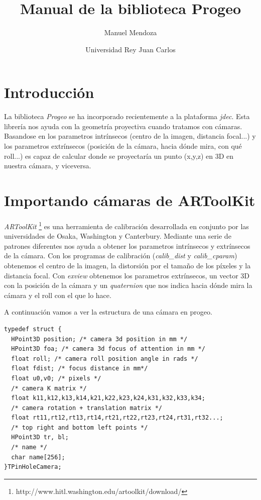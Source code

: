 \documentclass[a4paper,12pt,notitlepage,openany]{article}
\title{Manual de la biblioteca Progeo}
\author{Manuel Mendoza}
\date{Universidad Rey Juan Carlos}
\begin{document}
\maketitle
\tableofcontents

\section{Introducci\'on}

La biblioteca \textit{Progeo} se ha incorporado recientemente a la plataforma \textit{jdec}. Esta librer\'{i}a nos ayuda con la geometr\'{i}a proyectiva cuando tratamos con c\'{a}maras. Basandose en los parametros intr\'{i}nsecos (centro de la imagen, distancia focal...) y los parametros extr\'{i}nsecos (posici\'{o}n de la c\'{a}mara, hacia d\'{o}nde mira, con qu\'{e} roll...) es capaz de calcular donde se proyectar\'{i}a un punto (x,y,z) en 3D en nuestra c\'{a}mara, y viceversa.

\section{Importando c\'{a}maras de ARToolKit}

\textit{ARToolKit} \footnote{\label{1}http://www.hitl.washington.edu/artoolkit/download/} es una herramienta de calibraci\'{o}n desarrollada en conjunto por las universidades de Osaka, Washington y Canterbury. Mediante una serie de patrones diferentes nos ayuda a obtener los parametros intr\'{i}nsecos y extr\'{i}nsecos de la c\'{a}mara. Con los programas de calibraci\'{o}n (\textit{calib\_dist} y \textit{calib\_cparam}) obtenemos el centro de la imagen, la distorsi\'{o}n por el tama\~{n}o de los p\'{i}xeles y la distancia focal. Con \textit{exview} obtenemos los parametros extr\'{i}nsecos, un vector 3D con la posici\'{o}n de la c\'{a}mara y un \textit{quaternion} que nos indica hacia d\'{o}nde mira la c\'{a}mara y el roll con el que lo hace.

A continuaci\'{o}n vamos a ver la estructura de una c\'{a}mara en progeo.
\begin{verbatim}
typedef struct {
  HPoint3D position; /* camera 3d position in mm */
  HPoint3D foa; /* camera 3d focus of attention in mm */
  float roll; /* camera roll position angle in rads */
  float fdist; /* focus distance in mm*/
  float u0,v0; /* pixels */
  /* camera K matrix */
  float k11,k12,k13,k14,k21,k22,k23,k24,k31,k32,k33,k34;
  /* camera rotation + translation matrix */
  float rt11,rt12,rt13,rt14,rt21,rt22,rt23,rt24,rt31,rt32...;
  /* top right and bottom left points */
  HPoint3D tr, bl;
  /* name */
  char name[256];
}TPinHoleCamera;
\end{verbatim}
\end{document}
